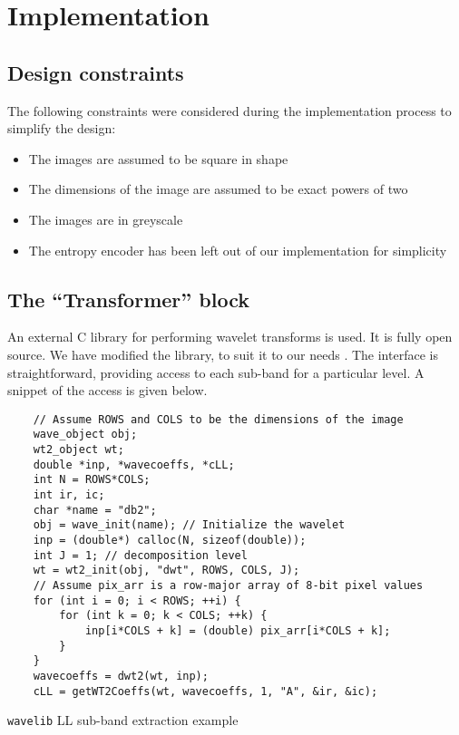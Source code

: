 \documentclass[./A14_Report.tex]{subfiles}
\begin{document}
\chapter{Implementation}

\section{Design constraints}
The following constraints were considered during the implementation process to
simplify the design:
\begin{itemize}
    \item The images are assumed to be square in shape
    \item The dimensions of the image are assumed to be exact powers of two
    \item The images are in greyscale
    \item The entropy encoder has been left out of our implementation for simplicity
\end{itemize}

\section{The ``Transformer'' block}

An external C library for performing wavelet transforms is used. It is fully
open source. We have modified the library, to suit it to our needs
\cite{rpwavelib}. The interface is straightforward, providing access to each
sub-band for a particular level. A snippet of the access is given below.

\begin{code}
    \begin{verbatim}
    // Assume ROWS and COLS to be the dimensions of the image
    wave_object obj;
    wt2_object wt;
    double *inp, *wavecoeffs, *cLL;
    int N = ROWS*COLS;
    int ir, ic;
    char *name = "db2";
    obj = wave_init(name); // Initialize the wavelet
    inp = (double*) calloc(N, sizeof(double));
    int J = 1; // decomposition level
    wt = wt2_init(obj, "dwt", ROWS, COLS, J);
    // Assume pix_arr is a row-major array of 8-bit pixel values
    for (int i = 0; i < ROWS; ++i) {
        for (int k = 0; k < COLS; ++k) {
            inp[i*COLS + k] = (double) pix_arr[i*COLS + k];
        }
    }
    wavecoeffs = dwt2(wt, inp);
    cLL = getWT2Coeffs(wt, wavecoeffs, 1, "A", &ir, &ic);
    \end{verbatim}
    \caption{\texttt{wavelib} LL sub-band extraction example}
    \label{code:wavelibex}
\end{code}
\end{document}
